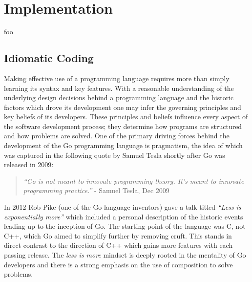 
\section{Implementation}




foo


\subsection{Idiomatic Coding}

Making effective use of a programming language requires more than simply learning its syntax and key features. With a reasonable understanding of the underlying design decisions behind a programming language and the historic factors which drove its development one may infer the governing principles and key beliefs of its developers. These principles and beliefs influence every aspect of the software development process; they determine how programs are structured and how problems are solved. One of the primary driving forces behind the development of the Go programming language is pragmatism, the idea of which was captured in the following quote by Samuel Tesla shortly after Go was released in 2009:

\begin{quote}
	\textit{``Go is not meant to innovate programming theory. It's meant to innovate programming practice.''} - Samuel Tesla, Dec 2009 \cite{pragmatic}
\end{quote}

In 2012 Rob Pike (one of the Go language inventors) gave a talk titled \textit{``Less is exponentially more''} which included a personal description of the historic events leading up to the inception of Go. The starting point of the language was C, not C++, which Go aimed to simplify further by removing cruft. This stands in direct contrast to the direction of C++ which gains more features with each passing release. The \textit{less is more} mindset is deeply rooted in the mentality of Go developers and there is a strong emphasis on the use of composition to solve problems.

